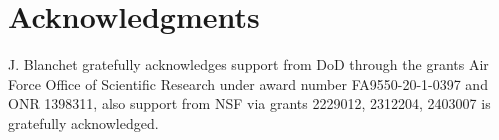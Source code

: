 \documentclass[pdflatex,sn-mathphys-ay]{sn-jnl}%
\numberwithin{equation}{section}
\theoremstyle{thmstyleone}%
\theoremstyle{thmstyletwo}%
\theoremstyle{thmstylethree}%
\newenvironment{acknowledgments}{%
  \section*{Acknowledgments}%
}{}
\begin{document}
\begin{acknowledgments}
J. Blanchet gratefully acknowledges support from DoD through the grants Air Force Office of Scientific Research under award number FA9550-20-1-0397 and ONR 1398311, also support from NSF via grants 2229012, 2312204, 2403007 is gratefully acknowledged.
\end{acknowledgments}







%
\end{document}
